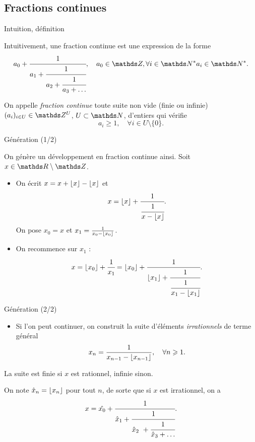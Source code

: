 
\subsection{Fractions continues}

\begin{frame}{Intuition, définition}

Intuitivement, une fraction continue est une expression de la forme \[a_0 +
\cfrac{1}{a_1 + \cfrac{1}{a_2 + \cfrac{1}{a_3 + \dots}}}, \quad a_0\in \Z,
\forall i \in \N^* a_i \in \N^*.\]

\pause

\begin{definition}
	On appelle \emph{fraction continue} toute suite non vide (finie ou infinie)
	$(a_i)_{i\in U} \in \Z^U$, $U\subset \N$, d'entiers qui vérifie \[a_i
	\geq 1, \quad \forall i\in U\setminus\{0\}.\]
\end{definition}
\end{frame}

\begin{frame}{Génération (1/2)}

On génère un développement en fraction continue ainsi. Soit $x\in
\R\setminus{\Z}$.

\begin{itemize}
	\item On écrit $x = x + \lfloor x\rfloor - \lfloor x\rfloor$ et \[x = \lfloor x\rfloor +
	\cfrac{1}{\cfrac{1}{x - \lfloor x\rfloor}}.\] On pose $x_0 = x$ et $x_1 =
	\frac{1}{x_0 - \lfloor x_0\rfloor}$.

	\pause

	\item On recommence sur $x_1$ : \[x = \lfloor x_0\rfloor + \cfrac{1}{x_1} =
	\lfloor x_0\rfloor + \cfrac{1}{\lfloor x_1\rfloor + \cfrac{1}{\cfrac{1}{x_1 - \lfloor x_1\rfloor}}}.\] 
\end{itemize}
\end{frame}

\begin{frame}{Génération (2/2)}
\begin{itemize}
	\item Si l'on peut continuer, on construit la suite d'éléments
	\emph{irrationnels} de terme général \[x_n = \frac{1}{x_{n-1} -
	\lfloor x_{n-1}\rfloor}, \quad \forall n \geqslant 1.\]
\end{itemize}

\pause
\vspace{1em}
La suite est finie si $x$ est rationnel, infinie sinon. \vspace{1em}

On note $\hat{x}_n = \lfloor x_n\rfloor$ pour tout $n$, de sorte que si $x$ est
irrationnel, on a \[x = \hat{x_0} + \cfrac{1}{\hat{x}_1 + \cfrac{1}{\hat{x}_2 +
\cfrac{1}{\hat{x}_3 + \dots}}}.\]
\end{frame}

